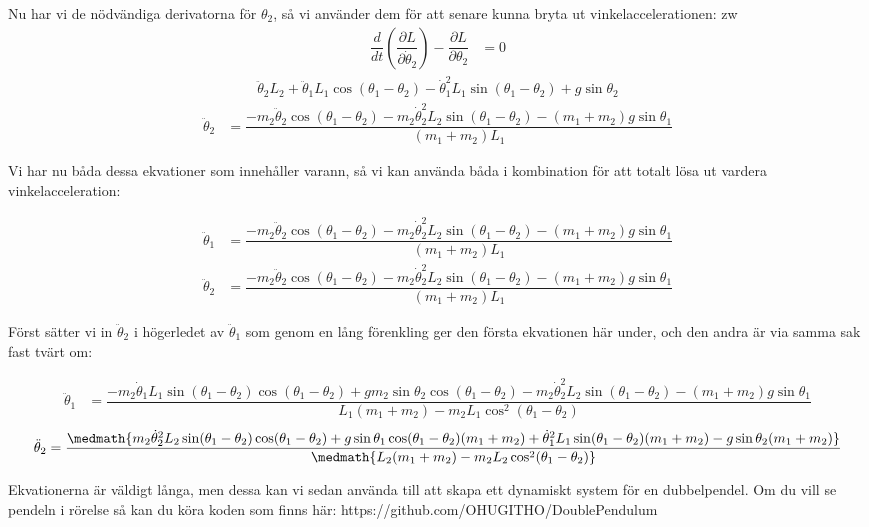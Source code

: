 \documentclass[10pt, a4paper]{amsart}
\begin{document}
Nu har vi de nödvändiga derivatorna för $ \theta_2 $, så vi använder dem för att senare kunna bryta ut vinkelaccelerationen: \bigskip 
zw
\begin{align}
    \dfrac{d}{dt} (\dfrac{\partial L}{\partial\dot\theta_2}) - \dfrac{\partial L}{\partial\theta_2} &= 0
\end{align}
\begin{align}
    \ddot\theta_2L_2 + \ddot\theta_1L_1\cos(\theta_1 - \theta_2) - \dot\theta_1^2L_1\sin(\theta_1 - \theta_2) + g\sin\theta_2
\end{align}
\begin{align}
    \ddot\theta_2 &= \dfrac{-m_2\ddot\theta_2\cos(\theta_1 - \theta_2) - m_2\dot\theta_2^2L_2\sin(\theta_1 - \theta_2) - (m_1 + m_2)g\sin\theta_1}{(m_1 + m_2)L_1}
\end{align} \bigskip

Vi har nu båda dessa ekvationer som innehåller varann, så vi kan använda båda i kombination för att totalt lösa ut vardera vinkelacceleration: \bigskip 

\begin{align}
    \ddot\theta_1 &= \dfrac{-m_2\ddot\theta_2\cos(\theta_1 - \theta_2) - m_2\dot\theta_2^2L_2\sin(\theta_1 - \theta_2) - (m_1 + m_2)g\sin\theta_1}{(m_1 + m_2)L_1} \\
    \ddot\theta_2 &= \dfrac{-m_2\ddot\theta_2\cos(\theta_1 - \theta_2) - m_2\dot\theta_2^2L_2\sin(\theta_1 - \theta_2) - (m_1 + m_2)g\sin\theta_1}{(m_1 + m_2)L_1}
\end{align} \bigskip 

Först sätter vi in $ \ddot\theta_2 $ i högerledet av $ \ddot\theta_1 $ som genom en lång förenkling ger den första ekvationen här under, 
och den andra är via samma sak fast tvärt om: \bigskip 

\begin{align}
    \ddot\theta_1 &= \dfrac{-m_2\dot\theta_1L_1\sin(\theta_1 - \theta_2)\cos(\theta_1 - \theta_2) + gm_2\sin\theta_2\cos(\theta_1 - \theta_2) - m_2\dot\theta_2^2L_2\sin(\theta_1 - \theta_2) - (m_1 + m_2)g\sin\theta_1}{L_1(m_1 + m_2) - m_2L_1\cos^2(\theta_1 - \theta_2)}
\end{align}
\begin{multline}
    \ddot\theta_2 = \dfrac{\medmath{m_2\dot\theta_2^2L_2\sin(\theta_1 - \theta_2)\cos(\theta_1 - \theta_2) + g\sin\theta_1\cos(\theta_1 - \theta_2)(m_1 + m_2) + \dot\theta_1^2L_1\sin(\theta_1 - \theta_2)(m_1 + m_2) - g\sin\theta_2(m_1 + m_2)}}{\medmath{L_2(m_1 + m_2) - m_2L_2\cos^2(\theta_1 - \theta_2)}}
\end{multline} \bigskip 

Ekvationerna är väldigt långa, men dessa kan vi sedan använda till att skapa ett dynamiskt system för en dubbelpendel. 
Om du vill se pendeln i rörelse så kan du köra koden som finns här: https://github.com/OHUGITHO/DoublePendulum
\end{document}
